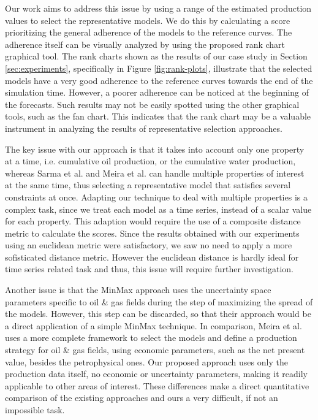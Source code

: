 \documentclass[final,5p,times,twocolumn]{elsarticle}
\begin{document}
Our work aims to address this issue by using a range of the estimated production values to select the representative models. We do this by calculating a score prioritizing the general adherence of the models to the reference curves. The adherence itself can be visually analyzed by using the proposed rank chart graphical tool. The rank charts shown as the results of our case study in Section \ref{sec:experiments}, specifically in Figure \ref{fig:rank-plots}, illustrate that the selected models have a very good adherence to the reference curves towards the end of the simulation time. However, a poorer adherence can be noticed at the beginning of the forecasts. Such results may not be easily spotted using the other graphical tools, such as the fan chart. This indicates that the rank chart may be a valuable instrument in analyzing the results of representative selection approaches.

The key issue with our approach is that it takes into account only one property at a time, i.e. cumulative oil production, or the cumulative water production, whereas Sarma et al. and Meira et al. can handle multiple properties of interest at the same time, thus selecting a representative model that satisfies several constraints at once. Adapting our technique to deal with multiple properties is a complex task, since we treat each model as a time series, instead of a scalar value for each property. This adaption would require the use of a composite distance metric to calculate the scores. Since the results obtained with our experiments using an euclidean metric were satisfactory, we saw no need to apply a more sofisticated distance metric. However the euclidean distance is hardly ideal for time series related task and thus, this issue will require further investigation. %

Another issue is that the MinMax approach uses the uncertainty space parameters specific to oil \& gas fields during the step of maximizing the spread of the models. However, this step can be discarded, so that their approach would be a direct application of a simple MinMax technique. In comparison, Meira et al. uses a more complete framework to select the models and define a production strategy for oil \& gas fields, using economic parameters, such as the net present value, besides the petrophysical ones. Our proposed approach uses only the production data itself, no economic or uncertainty parameters, making it readily applicable to other areas of interest. These differences make a direct quantitative comparison of the existing approaches and ours a very difficult, if not an impossible task.
\end{document}
